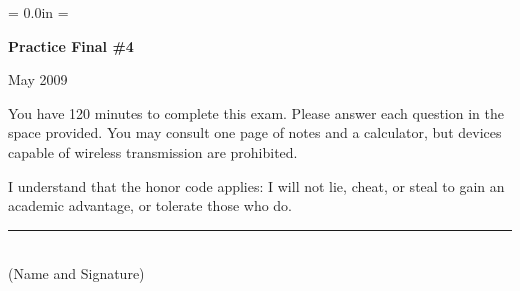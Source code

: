 \documentclass[letterpaper,12pt]{exam}
\def\HeadName{Practice Final \#1}
\begin{document}


\newpage
\def\HeadName{Practice Final \#4}
\parindent = 0.0in
\parskip = \bigskipamount
\thispagestyle{empty}
\Head

\centerline{\large \bf \HeadName}%
\centerline{May 2009}

\bigskip
You have 120 minutes to complete this exam.  Please answer each
question in the space provided. You may consult one page of notes
and a calculator, but devices capable of wireless transmission are
prohibited.

I understand that the honor code applies: I will not lie, cheat,
or steal to gain an academic advantage, or tolerate those who do.

\begin{flushright}
\rule{4in}{0.5pt} \\ (Name and Signature)
\end{flushright}
\end{document}
